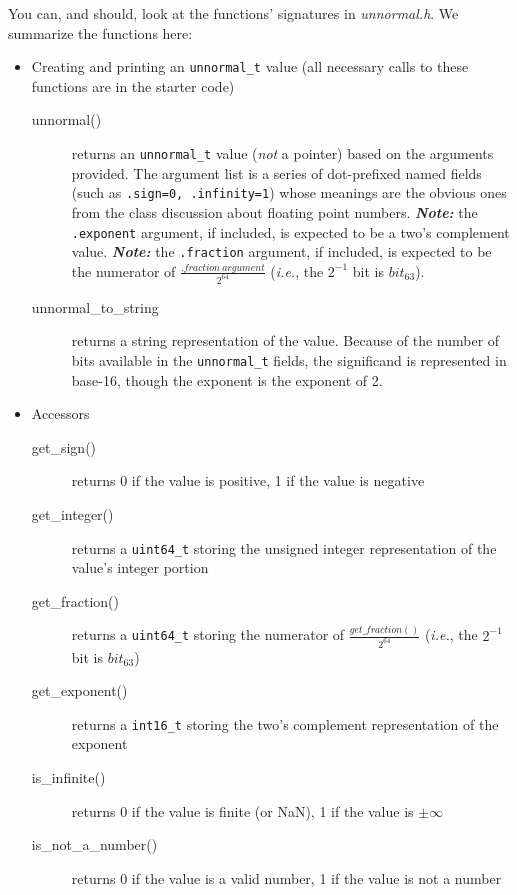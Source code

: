 You can, and should, look at the functions' signatures in \textit{unnormal.h}.
We summarize the functions here:

\begin{itemize}
    \item Creating and printing an \lstinline{unnormal_t} value (all necessary calls to these functions are in the starter code)
    \begin{description}
        \item[unnormal()] returns an \lstinline{unnormal_t} value (\textit{not} a pointer) based on the arguments provided.
            The argument list is a series of dot-prefixed named fields (such as \lstinline{.sign=0, .infinity=1}) whose meanings are the obvious ones from the class discussion about floating point numbers.
            \textit{\textbf{Note: }} the \lstinline{.exponent} argument, if included, is expected to be a two's complement value.
            \textit{\textbf{Note: }} the \lstinline{.fraction} argument, if included, is expected to be the numerator of $\frac{.fraction\ argument}{2^{64}}$ (\textit{i.e.}, the $2^{-1}$ bit is $bit_{63}$)\@.
        \item[unnormal\_to\_string] returns a string representation of the value.
            Because of the number of bits available in the \lstinline{unnormal_t} fields, the significand is represented in base-16, though the exponent is the exponent of 2.
    \end{description}
    \item Accessors
    \begin{description}
        \item[get\_sign()] returns 0 if the value is positive, 1 if the value is negative
        \item[get\_integer()] returns a \lstinline{uint64_t} storing the unsigned integer representation of the value's integer portion
        \item[get\_fraction()] returns a \lstinline{uint64_t} storing the numerator of $\frac{get\_fraction()}{2^{64}}$ (\textit{i.e.}, the $2^{-1}$ bit is $bit_{63}$)
        \item[get\_exponent()] returns a \lstinline{int16_t} storing the two's complement representation of the exponent
        \item[is\_infinite()] returns 0 if the value is finite (or NaN), 1 if the value is $\pm\infty$
        \item[is\_not\_a\_number()] returns 0 if the value is a valid number, 1 if the value is not a number

\end{description}
\end{itemize}
